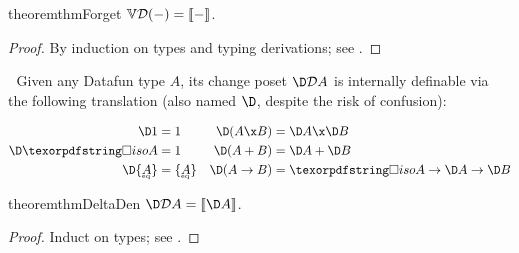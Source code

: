 \documentclass{rntz}\usepackage{fantasy}%
\begin{document}
\begin{restatable}{theorem}{thmForget}
  \label{thm:forget}
  \(\mathbb{V}{\mathcal{D}({-})} = \llbracket{-}\rrbracket\).
\end{restatable}

\begin{proof}
  By induction on types and typing derivations; see .
\end{proof}


Given any Datafun type $A$, its change poset $\D\incdens A$ is internally
definable via the following translation (also named $\D$, despite the risk of
confusion):

\nopagebreak[2]
\begin{align*}
  \D\tunit &= \tunit
  & \D(A \x B) &= \D A \x \D B
  \\
  \D \isof A &= \tunit
  & \D(A + B) &= \D A + \D B
  \\
  \D\tset{\eqt A} &= \tset{\eqt A}
  & \D(A \to B) &= \isof A \to \D A \to \D B
\end{align*}

\begin{restatable}{theorem}{thmDeltaDen}
  \label{thm:delta-den}
  \(\D\incdens A = \den{\D A}\).
\end{restatable}
\begin{proof}
  Induct on types; see .
\end{proof}


\end{document}
